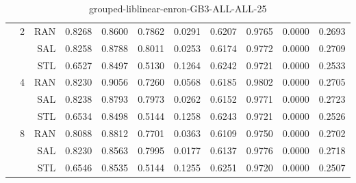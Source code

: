 \begin{center}
\begin{table}[htbp]
\begin{center}
\begin{tabular}{ | r | r | r | r | r | r | r | r | r | r | r |}
 & \multirow{3}{*}{2} & RAN & 0.8268 & 0.8600 & 0.7862 & 0.0291 & 0.6207 & 0.9765 & 0.0000 & 0.2693\\ \cline{3-11}
 &   & SAL & 0.8258 & 0.8788 & 0.8011 & 0.0253 & 0.6174 & 0.9772 & 0.0000 & 0.2709\\ \cline{3-11}
 &   & STL & 0.6527 & 0.8497 & 0.5130 & 0.1264 & 0.6242 & 0.9721 & 0.0000 & 0.2533\\ \cline{2-11}
 & \multirow{3}{*}{4} & RAN & 0.8230 & 0.9056 & 0.7260 & 0.0568 & 0.6185 & 0.9802 & 0.0000 & 0.2705\\ \cline{3-11}
 &   & SAL & 0.8238 & 0.8793 & 0.7973 & 0.0262 & 0.6152 & 0.9771 & 0.0000 & 0.2723\\ \cline{3-11}
 &   & STL & 0.6534 & 0.8498 & 0.5144 & 0.1258 & 0.6243 & 0.9721 & 0.0000 & 0.2526\\ \cline{2-11}
 & \multirow{3}{*}{8} & RAN & 0.8088 & 0.8812 & 0.7701 & 0.0363 & 0.6109 & 0.9750 & 0.0000 & 0.2702\\ \cline{3-11}
 &   & SAL & 0.8230 & 0.8563 & 0.7995 & 0.0177 & 0.6137 & 0.9776 & 0.0000 & 0.2718\\ \cline{3-11}
 &   & STL & 0.6546 & 0.8535 & 0.5144 & 0.1255 & 0.6251 & 0.9720 & 0.0000 & 0.2507\\ \cline{2-11}
\hline
\end{tabular}
\caption{grouped-liblinear-enron-GB3-ALL-ALL-25}
\end{center}
 \end{table}
\end{center}

